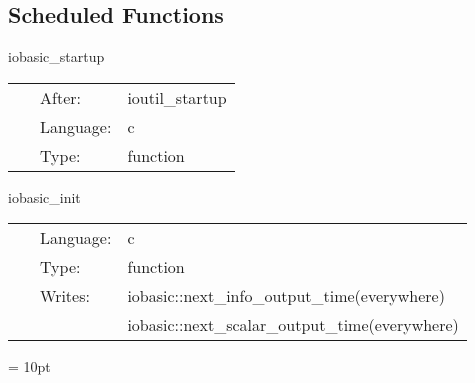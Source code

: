 \documentclass{article}
\begin{document}
\subsection*{Scheduled Functions}
\vspace{5mm}


\hspace{5mm} iobasic\_startup 

\hspace{5mm}{\it startup routine } 


\hspace{5mm}

 \begin{tabular*}{160mm}{cll} 
~ & After:  & ioutil\_startup \\ 
~ & Language:  & c \\ 
~ & Type:  & function \\ 
\end{tabular*} 


\vspace{5mm}


\hspace{5mm} iobasic\_init 

\hspace{5mm}{\it initialisation routine } 


\hspace{5mm}

 \begin{tabular*}{160mm}{cll} 
~ & Language:  & c \\ 
~ & Type:  & function \\ 
~ & Writes:  & iobasic::next\_info\_output\_time(everywhere) \\ 
~& ~ &iobasic::next\_scalar\_output\_time(everywhere)\\ 
\end{tabular*} 



\vspace{5mm}\parskip = 10pt 
\end{document}
